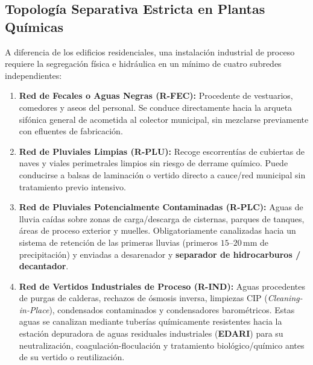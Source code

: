 \documentclass{report}
\begin{document}
\subsection{Topología Separativa Estricta en Plantas Químicas}
A diferencia de los edificios residenciales, una instalación industrial de proceso requiere la segregación física e hidráulica en un mínimo de cuatro subredes independientes:
\begin{enumerate}
    \item \textbf{Red de Fecales o Aguas Negras (R-FEC):} Procedente de vestuarios, comedores y aseos del personal. Se conduce directamente hacia la arqueta sifónica general de acometida al colector municipal, sin mezclarse previamente con efluentes de fabricación.
    \item \textbf{Red de Pluviales Limpias (R-PLU):} Recoge escorrentías de cubiertas de naves y viales perimetrales limpios sin riesgo de derrame químico. Puede conducirse a balsas de laminación o vertido directo a cauce/red municipal sin tratamiento previo intensivo.
    \item \textbf{Red de Pluviales Potencialmente Contaminadas (R-PLC):} Aguas de lluvia caídas sobre zonas de carga/descarga de cisternas, parques de tanques, áreas de proceso exterior y muelles. Obligatoriamente canalizadas hacia un sistema de retención de las primeras lluvias (primeros $15\text{--}20\,\text{mm}$ de precipitación) y enviadas a desarenador y \textbf{separador de hidrocarburos / decantador}.
    \item \textbf{Red de Vertidos Industriales de Proceso (R-IND):} Aguas procedentes de purgas de calderas, rechazos de ósmosis inversa, limpiezas CIP (\textit{Cleaning-in-Place}), condensados contaminados y condensadores barométricos. Estas aguas se canalizan mediante tuberías químicamente resistentes hacia la estación depuradora de aguas residuales industriales (\textbf{EDARI}) para su neutralización, coagulación-floculación y tratamiento biológico/químico antes de su vertido o reutilización.
\end{enumerate}
\end{document}
